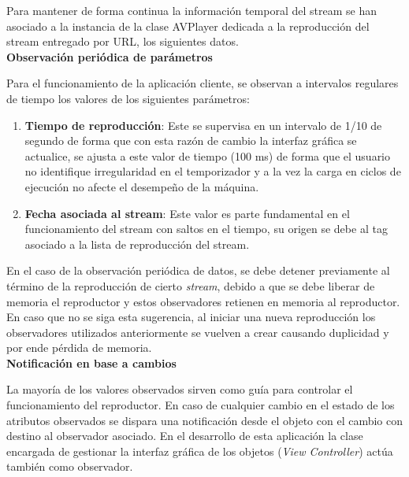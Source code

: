 Para mantener de forma continua la información temporal del stream se han asociado a la instancia de la clase AVPlayer dedicada a la reproducción del stream entregado por URL, los siguientes datos.\\

\textbf{Observación periódica de parámetros}

Para el funcionamiento de la aplicación cliente, se observan a intervalos regulares de tiempo los valores de los siguientes parámetros:

\begin{enumerate}
\item \textbf{Tiempo de reproducción}: Este se supervisa en un intervalo de 1/10 de segundo de forma que con esta razón de cambio la interfaz gráfica se actualice, se ajusta a  este valor de tiempo (100 ms) de forma que el usuario no identifique irregularidad en el temporizador y a la vez la carga en ciclos de ejecución no afecte el desempeño de la máquina.
\item \textbf{Fecha asociada al stream}: Este valor es parte fundamental en el funcionamiento del stream con saltos en el tiempo, su origen se debe al tag asociado a la lista de reproducción del stream.
\label{observer-date}

\end{enumerate}

En el caso de la observación periódica de datos, se debe detener previamente al término de la reproducción de cierto \textit{stream}, debido a que se debe liberar de memoria el reproductor y estos observadores retienen en memoria al reproductor. En caso que no se siga esta sugerencia, al iniciar una nueva reproducción los observadores utilizados anteriormente se vuelven a crear causando duplicidad y por ende pérdida de memoria.\\


\textbf{Notificación en base a cambios}

La mayoría de los valores observados sirven como guía para controlar el funcionamiento del reproductor. En caso de cualquier cambio en el estado de los atributos observados se dispara una notificación desde el objeto con el cambio con destino al observador asociado. 
En el desarrollo de esta aplicación la clase encargada de gestionar la interfaz gráfica de los objetos (\textit{View Controller}) actúa también como observador.\\

